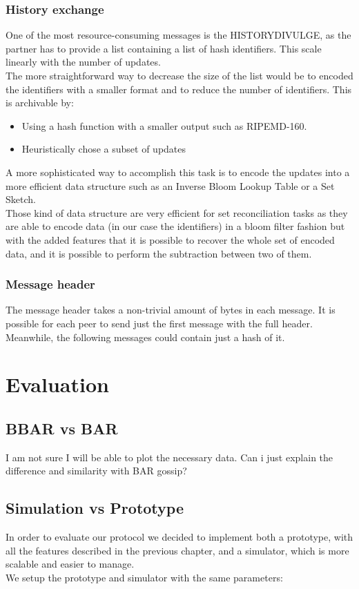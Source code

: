 \documentclass[mscthesis]{usiinfthesis}
\begin{document}
\subsection{History exchange}
One of the most resource-consuming messages is the HISTORYDIVULGE, as the partner has to provide a list containing a list of hash identifiers. This scale linearly with the number of updates. \\
The more straightforward way to decrease the size of the list would be to encoded the identifiers with a smaller format and to reduce the number of identifiers. This is archivable by:
\begin{itemize}
	\item Using a hash function with a smaller output such as RIPEMD-160.
	\item Heuristically chose a subset of updates
\end{itemize}
A more sophisticated way to accomplish this task is to encode the updates into a more efficient data structure such as an Inverse Bloom Lookup Table or a Set Sketch. \\
Those kind of data structure are very efficient for set reconciliation tasks as they are able to encode data (in our case the identifiers) in a bloom filter fashion but with the added features that it is possible to recover the whole set of encoded data, and it is possible to perform the subtraction between two of them.

\subsection{Message header}
The message header takes a non-trivial amount of bytes in each message. It is possible for each peer to send just the first message with the full header.\\ Meanwhile, the following messages could contain just a hash of it.

\chapter{Evaluation}
\section{BBAR vs BAR}
I am not sure I will be able to plot the necessary data. Can i just explain the difference and similarity with BAR gossip?
\section{Simulation vs Prototype}
In order to evaluate our protocol we decided to implement both a prototype, with all the features described in the previous chapter, and a simulator, which is more scalable and easier to manage. \\
We setup the prototype and simulator with the same parameters: 
\end{document}

